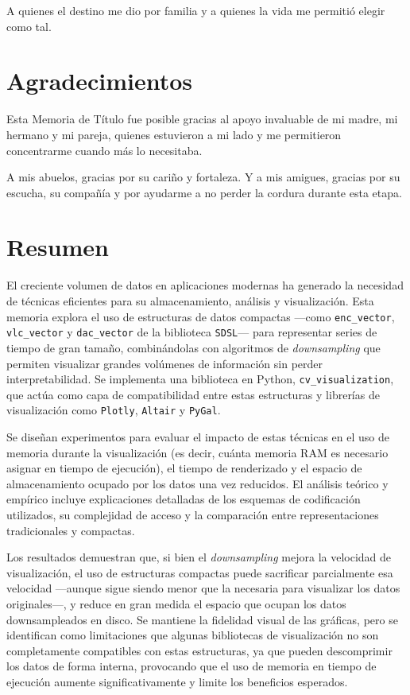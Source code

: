\documentclass[12pt,twoside]{report}
\begin{document}
\clearpage
\onehalfspace
\vspace*{5cm}
\begin{flushright}
	A quienes el destino me dio por familia y a quienes la vida me permitió elegir como tal.
\end{flushright}

\chapter*{Agradecimientos}
\thispagestyle{empty}
Esta Memoria de Título fue posible gracias al apoyo invaluable de mi madre, mi hermano y mi pareja, quienes estuvieron a mi lado y me permitieron concentrarme cuando más lo necesitaba.

A mis abuelos, gracias por su cariño y fortaleza. Y a mis amigues, gracias por su escucha, su compañía y por ayudarme a no perder la cordura durante esta etapa.
\clearpage
\pagestyle{plain}
\chapter*{Resumen}
El creciente volumen de datos en aplicaciones modernas ha generado la necesidad de técnicas eficientes para su almacenamiento, análisis y visualización. Esta memoria explora el uso de estructuras de datos compactas —como \texttt{enc\_vector}, \texttt{vlc\_vector} y \texttt{dac\_vector} de la biblioteca \texttt{SDSL}— para representar series de tiempo de gran tamaño, combinándolas con algoritmos de \textit{downsampling} que permiten visualizar grandes volúmenes de información sin perder interpretabilidad. Se implementa una biblioteca en Python, \texttt{cv\_visualization}, que actúa como capa de compatibilidad entre estas estructuras y librerías de visualización como \texttt{Plotly}, \texttt{Altair} y \texttt{PyGal}.

Se diseñan experimentos para evaluar el impacto de estas técnicas en el uso de memoria durante la visualización (es decir, cuánta memoria RAM es necesario asignar en tiempo de ejecución), el tiempo de renderizado y el espacio de almacenamiento ocupado por los datos una vez reducidos. El análisis teórico y empírico incluye explicaciones detalladas de los esquemas de codificación utilizados, su complejidad de acceso y la comparación entre representaciones tradicionales y compactas.

Los resultados demuestran que, si bien el \textit{downsampling} mejora la velocidad de visualización, el uso de estructuras compactas puede sacrificar parcialmente esa velocidad —aunque sigue siendo menor que la necesaria para visualizar los datos originales—, y reduce en gran medida el espacio que ocupan los datos downsampleados en disco. Se mantiene la fidelidad visual de las gráficas, pero se identifican como limitaciones que algunas bibliotecas de visualización no son completamente compatibles con estas estructuras, ya que pueden descomprimir los datos de forma interna, provocando que el uso de memoria en tiempo de ejecución aumente significativamente y limite los beneficios esperados.
\end{document}
